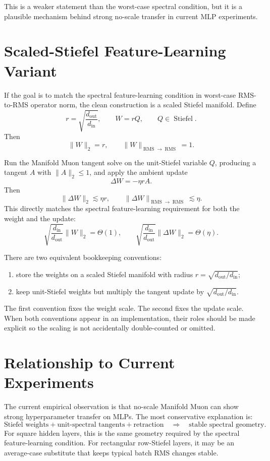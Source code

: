 \documentclass[12pt]{article}
\newcommand{\rms}{\operatorname{RMS}}
\newcommand{\Stiefel}{\operatorname{Stiefel}}
\newcommand{\fanin}{d_{\mathrm{in}}}
\newcommand{\fanout}{d_{\mathrm{out}}}
\begin{document}
This is a weaker statement than the worst-case spectral condition, but it is a
plausible mechanism behind strong no-scale transfer in current MLP
experiments.

\section{Scaled-Stiefel Feature-Learning Variant}

If the goal is to match the spectral feature-learning condition in worst-case
RMS-to-RMS operator norm, the clean construction is a scaled Stiefel manifold.
Define
\[
    r = \sqrt{\frac{\fanout}{\fanin}},
    \qquad
    W = rQ,
    \qquad
    Q \in \Stiefel.
\]
Then
\[
    \|W\|_2 = r,
    \qquad
    \|W\|_{\rms \to \rms} = 1.
\]

Run the Manifold Muon tangent solve on the unit-Stiefel variable $Q$, producing
a tangent $A$ with $\|A\|_2 \le 1$, and apply the ambient update
\[
    \Delta W = -\eta r A.
\]
Then
\[
    \|\Delta W\|_2 \lesssim \eta r,
    \qquad
    \|\Delta W\|_{\rms \to \rms} \lesssim \eta.
\]
This directly matches the spectral feature-learning requirement for both the
weight and the update:
\[
    \sqrt{\frac{\fanin}{\fanout}}\|W\|_2 = \Theta(1),
    \qquad
    \sqrt{\frac{\fanin}{\fanout}}\|\Delta W\|_2 = \Theta(\eta).
\]

There are two equivalent bookkeeping conventions:
\begin{enumerate}
    \item store the weights on a scaled Stiefel manifold with radius
    $r = \sqrt{\fanout/\fanin}$;
    \item keep unit-Stiefel weights but multiply the tangent update by
    $\sqrt{\fanout/\fanin}$.
\end{enumerate}
The first convention fixes the weight scale. The second fixes the update scale.
When both conventions appear in an implementation, their roles should be made
explicit so the scaling is not accidentally double-counted or omitted.

\section{Relationship to Current Experiments}

The current empirical observation is that no-scale Manifold Muon can show
strong hyperparameter transfer on MLPs. The most conservative explanation is:
\[
    \text{Stiefel weights}
    +
    \text{unit-spectral tangents}
    +
    \text{retraction}
    \quad
    \Rightarrow
    \quad
    \text{stable spectral geometry.}
\]
For square hidden layers, this is the same geometry required by the spectral
feature-learning condition. For rectangular row-Stiefel layers, it may be an
average-case substitute that keeps typical batch RMS changes stable.
\end{document}

